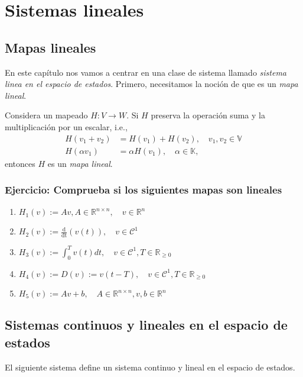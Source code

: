 \chapter{Sistemas lineales}

\section{Mapas lineales}

En este capítulo nos vamos a centrar en una clase de sistema llamado \emph{sistema linea en el espacio de estados}. Primero, necesitamos la noción de que es un \emph{mapa lineal}.

\begin{definition} Considera un mapeado $H: V \to W$. Si $H$ preserva la operación suma y la multiplicación por un escalar, i.e.,
\begin{align}
	H(v_1+v_2) &= H(v_1) + H(v_2), \quad v_1, v_2\in\mathbb{V} \nonumber \\
	H(\alpha v_1) &= \alpha H(v_1), \quad \alpha\in\mathbb{K} \nonumber,
\end{align}
	entonces $H$ es un \emph{mapa lineal}.
\end{definition}

\subsection{Ejercicio: Comprueba si los siguientes mapas son lineales}

\begin{enumerate}
	\item $H_1(v) := Av, A\in\mathbb{R}^{n\times n}, \quad v\in\mathbb{R}^n$
	\item $H_2(v) := \frac{\mathrm{d}}{\mathrm{dt}}(v(t)), \quad v\in\mathcal{C}^1$
	\item $H_3(v) := \int_0^T v(t) dt, \quad v\in\mathcal{C}^1, T\in\mathbb{R}_{\geq 0}$
	\item $H_4(v) := D(v) := v(t - T), \quad v\in\mathcal{C}^1, T\in\mathbb{R}_{\geq 0}$
	\item $H_5(v) := Av + b, \quad A\in\mathbb{R}^{n\times n}, v,b\in\mathbb{R}^n$
\end{enumerate}

\section{Sistemas continuos y lineales en el espacio de estados}

El siguiente sistema define un sistema continuo y lineal en el espacio de estados.

